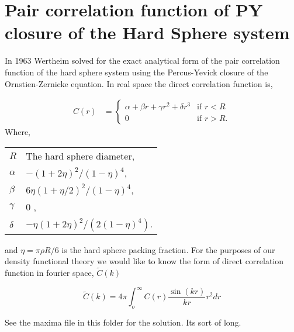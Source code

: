 \documentclass[11pt]{article}
\makeatletter
\newenvironment{conditions}
  {\par\vspace{\abovedisplayskip}\noindent\begin{tabular}{>{$}l<{$} @{${}={}$} l}}
  {\end{tabular}\par\vspace{\belowdisplayskip}}
\makeatother
\begin{document}
\section{Pair correlation function of PY closure of the Hard Sphere system}

In 1963 Wertheim solved for the exact analytical form of the pair correlation function of the hard sphere system using the Percus-Yevick closure of the Ornstien-Zernicke equation. In real space the direct correlation function is, 

\begin{align}
C(r) &=
	\begin{cases}
	\alpha + \beta r + \gamma r^2 + \delta r^3 & \text{if } r < R \\
	0 & \text{if } r > R.
	\end{cases}
\end{align} 
Where,
\begin{conditions}
R		& 	The hard sphere diameter, \\
\alpha	& 	$-(1 + 2\eta)^2/(1-\eta)^4$, \\
\beta	& 	$6\eta(1 + \eta/2)^2/(1-\eta)^4$, \\
\gamma 	&	0 ,\\
\delta	&	$-\eta(1+2\eta)^2/(2(1-\eta)^4)$.
\end{conditions}
and $\eta = \pi\rho R/6$ is the hard sphere packing fraction. For the purposes of our density functional theory we would like to know the form of direct correlation function in fourier space, $\tilde{C}(k)$

\begin{equation}
\tilde{C}(k) = 4\pi \int_o^{\infty} C(r) \frac{\sin(kr)}{kr} r^2 dr
\end{equation}

See the maxima file in this folder for the solution. Its sort of long.
\end{document}
